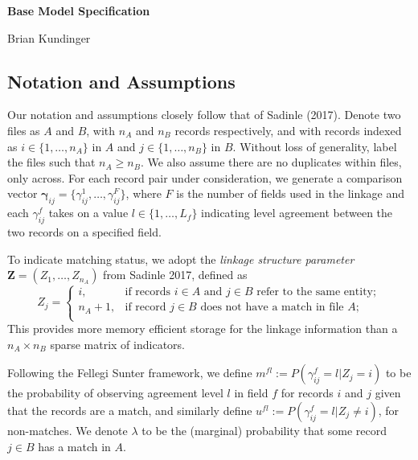 \documentclass[
  12pt,
]{article}
\author{}
\date{\vspace{-2.5em}}
\begin{document}
\begin{flushright} 
    \end{flushright}
    \begin{center} \textbf{Base Model Specification}
    
    Brian Kundinger

    \end{center}

\hypertarget{notation-and-assumptions}{%
\subsection{Notation and Assumptions}\label{notation-and-assumptions}}

Our notation and assumptions closely follow that of Sadinle (2017).
Denote two files as \(A\) and \(B\), with \(n_A\) and \(n_B\) records
respectively, and with records indexed as \(i \in \{1, \ldots, n_A\}\)
in \(A\) and \(j \in \{1, \ldots, n_B\}\) in \(B\). Without loss of
generality, label the files such that \(n_A \geq n_B\). We also assume
there are no duplicates within files, only across. For each record pair
under consideration, we generate a comparison vector
\(\boldsymbol{\gamma}_{ij} = \{\gamma_{ij}^1, \ldots, \gamma_{ij}^F\}\),
where \(F\) is the number of fields used in the linkage and each
\(\gamma_{ij}^f\) takes on a value \(l \in \{1, \ldots, L_f\}\)
indicating level agreement between the two records on a specified field.

To indicate matching status, we adopt the \emph{linkage structure
parameter} \(\mathbf{Z} = (Z_1, \ldots, Z_{n_A})\) from Sadinle 2017,
defined as \[Z_j=\begin{cases} 
    i,  & \text{if records } i\in A \text{ and } j\in B \text{ refer to the same entity}; \\
    n_A + 1,  & \text{if record } j\in B \text{ does not have a match in file } A; \\
\end{cases}\] This provides more memory efficient storage for the
linkage information than a \(n_A \times n_B\) sparse matrix of
indicators.

Following the Fellegi Sunter framework, we define
\(m^{fl}:= P(\gamma_{ij}^f = l |Z_j = i)\) to be the probability of
observing agreement level \(l\) in field \(f\) for records \(i\) and
\(j\) given that the records are a match, and similarly define
\(u^{fl}:= P(\gamma_{ij}^f = l |Z_j \neq i)\), for non-matches. We
denote \(\lambda\) to be the (marginal) probability that some record
\(j \in B\) has a match in \(A\).
\end{document}
